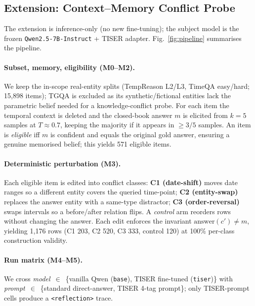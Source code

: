 \documentclass[conference]{IEEEtran}
\begin{document}
\subsection{Extension: Context--Memory Conflict Probe}

The extension is inference-only (no new fine-tuning); the subject model is the frozen \texttt{Qwen2.5-7B-Instruct} + TISER adapter. Fig.~\ref{fig:pipeline} summarises the pipeline.

\paragraph{Subset, memory, eligibility (M0--M2).}
We keep the in-scope real-entity splits (TempReason L2/L3, TimeQA easy/hard; 15,898 items); TGQA is excluded as its synthetic/fictional entities lack the parametric belief needed for a knowledge-conflict probe. For each item the temporal context is deleted and the closed-book answer $m$ is elicited from $k{=}5$ samples at $T{\approx}0.7$, keeping the majority if it appears in ${\geq}3/5$ samples. An item is \emph{eligible} iff $m$ is confident and equals the original gold answer, ensuring a genuine memorised belief; this yields 571 eligible items.

\paragraph{Deterministic perturbation (M3).}
Each eligible item is edited into conflict classes:
\textbf{C1 (date-shift)} moves date ranges so a different entity covers the queried time-point;
\textbf{C2 (entity-swap)} replaces the answer entity with a same-type distractor;
\textbf{C3 (order-reversal)} swaps intervals so a before/after relation flips.
A \emph{control} arm reorders rows without changing the answer. Each edit enforces the invariant $\text{answer}(c'){\neq}m$, yielding 1,176 rows (C1 203, C2 520, C3 333, control 120) at 100\% per-class construction validity.

\paragraph{Run matrix (M4--M5).}
We cross \emph{model}~$\in$~\{vanilla Qwen (\texttt{base}), TISER fine-tuned (\texttt{tiser})\} with \emph{prompt}~$\in$~\{standard direct-answer, TISER 4-tag prompt\}; only TISER-prompt cells produce a \texttt{<reflection>} trace.
\end{document}
